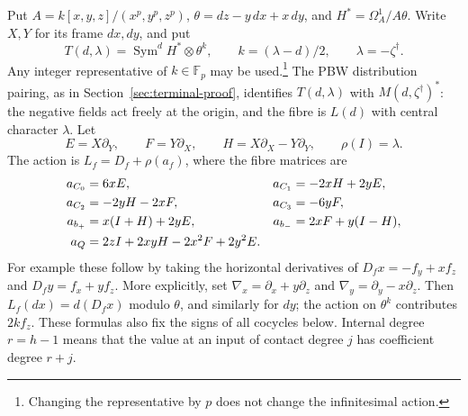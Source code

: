 \documentclass[11pt]{article}
\theoremstyle{plain}
\theoremstyle{definition}
\theoremstyle{remark}
\numberwithin{equation}{section}
\newcommand{\kk}{k}
\begin{document}
Put \(A=\kk[x,y,z]/(x^p,y^p,z^p)\),
\(\theta=dz-y\,dx+x\,dy\), and \(H^*=\Omega_A^1/A\theta\).
Write \(X,Y\) for its frame \(dx,dy\), and put
\[
 T(d,\lambda)=\operatorname{Sym}^dH^*\otimes\theta^k,\qquad
 k=(\lambda-d)/2,\qquad \lambda=-\zeta^\dagger .
\]
Any integer representative of \(k\in\mathbb F_p\) may be used.\footnote{Changing the representative by \(p\) does not change the infinitesimal action.} The PBW distribution pairing, as in
Section~\ref{sec:terminal-proof}, identifies \(T(d,\lambda)\) with
\(M(d,\zeta^\dagger)^*\): the negative fields act freely at the
origin, and the fibre is \(L(d)\) with central character \(\lambda\).
Let
\[
 E=X\partial_Y,\qquad F=Y\partial_X,\qquad
 H=X\partial_X-Y\partial_Y,\qquad \rho(I)=\lambda .
\]
The action is \(L_f=D_f+\rho(a_f)\), where the fibre matrices are
\begin{align}
 a_{C_0}&=6xE,& a_{C_1}&=-2xH+2yE,\notag\\
 a_{C_2}&=-2yH-2xF,&a_{C_3}&=-6yF,\notag\\
 a_{b_+}&=x(I+H)+2yE,&a_{b_-}&=2xF+y(I-H),\label{eq:tensor-action}\\
 a_Q&=2zI+2xyH-2x^2F+2y^2E.\notag
\end{align}
For example these follow by taking the horizontal derivatives of
\(D_fx=-f_y+xf_z\) and \(D_fy=f_x+yf_z\).
More explicitly, set
\(\nabla_x=\partial_x+y\partial_z\) and
\(\nabla_y=\partial_y-x\partial_z\).
Then \(L_f(dx)=d(D_fx)\) modulo \(\theta\), and similarly for \(dy\);
the action on \(\theta^k\) contributes \(2kf_z\).
These formulas also fix the signs of all cocycles below.
Internal degree \(r=h-1\) means that the value at an input of
contact degree \(j\) has coefficient degree \(r+j\).
\end{document}
